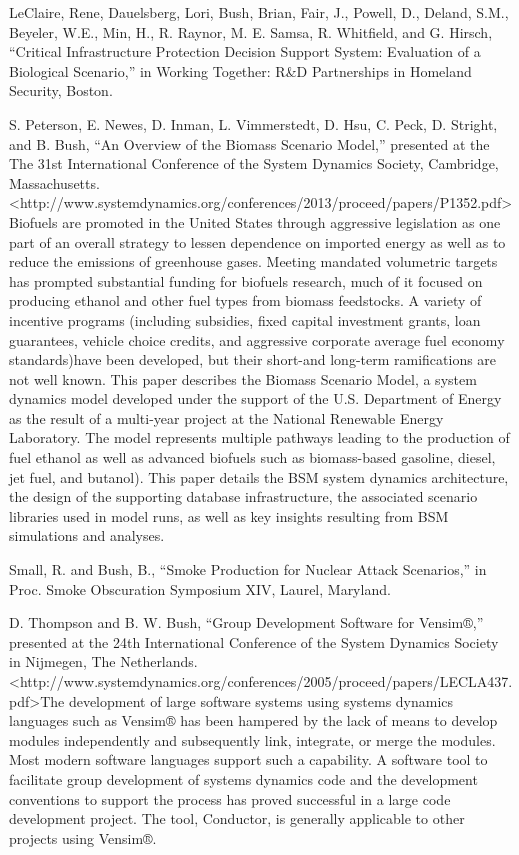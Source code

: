 \documentclass[]{article}
\begin{document}
LeClaire, Rene, Dauelsberg, Lori, Bush, Brian, Fair, J., Powell, D.,
Deland, S.M., Beyeler, W.E., Min, H., R. Raynor, M. E. Samsa, R.
Whitfield, and G. Hirsch, ``Critical Infrastructure Protection Decision
Support System: Evaluation of a Biological Scenario,'' in Working
Together: R\&D Partnerships in Homeland Security, Boston.

S. Peterson, E. Newes, D. Inman, L. Vimmerstedt, D. Hsu, C. Peck, D.
Stright, and B. Bush, ``An Overview of the Biomass Scenario Model,''
presented at the The 31st International Conference of the System
Dynamics Society, Cambridge, Massachusetts.
\textless{}http://www.systemdynamics.org/conferences/2013/proceed/papers/P1352.pdf\textgreater{}Biofuels
are promoted in the United States through aggressive legislation as one
part of an overall strategy to lessen dependence on imported energy as
well as to reduce the emissions of greenhouse gases. Meeting mandated
volumetric targets has prompted substantial funding for biofuels
research, much of it focused on producing ethanol and other fuel types
from biomass feedstocks. A variety of incentive programs (including
subsidies, fixed capital investment grants, loan guarantees, vehicle
choice credits, and aggressive corporate average fuel economy
standards)have been developed, but their short-and long-term
ramifications are not well known. This paper describes the Biomass
Scenario Model, a system dynamics model developed under the support of
the U.S. Department of Energy as the result of a multi-year project at
the National Renewable Energy Laboratory. The model represents multiple
pathways leading to the production of fuel ethanol as well as advanced
biofuels such as biomass-based gasoline, diesel, jet fuel, and butanol).
This paper details the BSM system dynamics architecture, the design of
the supporting database infrastructure, the associated scenario
libraries used in model runs, as well as key insights resulting from BSM
simulations and analyses.

Small, R. and Bush, B., ``Smoke Production for Nuclear Attack
Scenarios,'' in Proc. Smoke Obscuration Symposium XIV, Laurel, Maryland.

D. Thompson and B. W. Bush, ``Group Development Software for Vensim®,''
presented at the 24th International Conference of the System Dynamics
Society in Nijmegen, The Netherlands.
\textless{}http://www.systemdynamics.org/conferences/2005/proceed/papers/LECLA437.pdf\textgreater{}The
development of large software systems using systems dynamics languages
such as Vensim® has been hampered by the lack of means to develop
modules independently and subsequently link, integrate, or merge the
modules. Most modern software languages support such a capability. A
software tool to facilitate group development of systems dynamics code
and the development conventions to support the process has proved
successful in a large code development project. The tool, Conductor, is
generally applicable to other projects using Vensim®.
\end{document}
